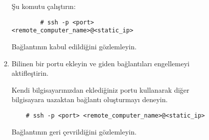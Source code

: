 \documentclass[a4paper,10pt]{article}
\begin{document}
\begin{enumerate}
\begin{enumerate}
\begin{enumerate}
\begin{enumerate}
                Şu komutu çalıştırın:
		\begin{verbatim}
		# ssh -p <port> <remote_computer_name>@<static_ip>
		\end{verbatim} 
                Bağlantının kabul edildiğini gözlemleyin.

            \item Bilinen bir portu ekleyin ve giden bağlantıları engellemeyi aktifleştirin.
            	
                  Kendi bilgisayarınızdan eklediğiniz portu kullanarak diğer bilgisayara uazaktan bağlantı oluşturmayı deneyin.
\begin{verbatim}
    # ssh -p <port> <remote_computer_name>@<static_ip>
\end{verbatim}

                    Bağlantının geri çevrildiğini gözlemleyin. 
            \end{enumerate}
        \end{enumerate}
    \end{enumerate}
\end{enumerate}
\end{document}
